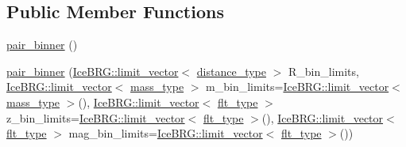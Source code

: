 \subsection*{Public Member Functions}
\begin{DoxyCompactItemize}
\item 
\hyperlink{classIceBRG_1_1pair__binner_a14fe5215ad45872e549c71ecc4e170e9}{pair\-\_\-binner} ()
\item 
\hyperlink{classIceBRG_1_1pair__binner_aa63e9ed393f3571585112990a36e58d1}{pair\-\_\-binner} (\hyperlink{classIceBRG_1_1limit__vector}{Ice\-B\-R\-G\-::limit\-\_\-vector}$<$ \hyperlink{namespaceIceBRG_a45499647eb87e24c10ab32c628711cec}{distance\-\_\-type} $>$ R\-\_\-bin\-\_\-limits, \hyperlink{classIceBRG_1_1limit__vector}{Ice\-B\-R\-G\-::limit\-\_\-vector}$<$ \hyperlink{namespaceIceBRG_a1be72ac4918a9b029f2eefa084213e35}{mass\-\_\-type} $>$ m\-\_\-bin\-\_\-limits=\hyperlink{classIceBRG_1_1limit__vector}{Ice\-B\-R\-G\-::limit\-\_\-vector}$<$ \hyperlink{namespaceIceBRG_a1be72ac4918a9b029f2eefa084213e35}{mass\-\_\-type} $>$(), \hyperlink{classIceBRG_1_1limit__vector}{Ice\-B\-R\-G\-::limit\-\_\-vector}$<$ \hyperlink{lib_2IceBRG__main_2common_8h_ad0f130a56eeb944d9ef2692ee881ecc4}{flt\-\_\-type} $>$ z\-\_\-bin\-\_\-limits=\hyperlink{classIceBRG_1_1limit__vector}{Ice\-B\-R\-G\-::limit\-\_\-vector}$<$ \hyperlink{lib_2IceBRG__main_2common_8h_ad0f130a56eeb944d9ef2692ee881ecc4}{flt\-\_\-type} $>$(), \hyperlink{classIceBRG_1_1limit__vector}{Ice\-B\-R\-G\-::limit\-\_\-vector}$<$ \hyperlink{lib_2IceBRG__main_2common_8h_ad0f130a56eeb944d9ef2692ee881ecc4}{flt\-\_\-type} $>$ mag\-\_\-bin\-\_\-limits=\hyperlink{classIceBRG_1_1limit__vector}{Ice\-B\-R\-G\-::limit\-\_\-vector}$<$ \hyperlink{lib_2IceBRG__main_2common_8h_ad0f130a56eeb944d9ef2692ee881ecc4}{flt\-\_\-type} $>$())
\item 

\end{DoxyCompactItemize}
